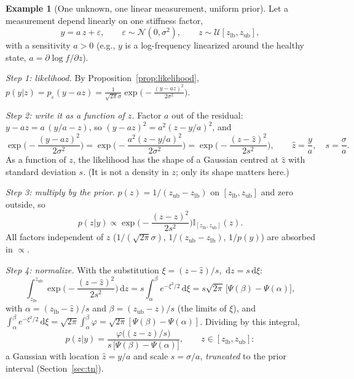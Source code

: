 \documentclass[11pt,a4paper]{article}
\numberwithin{equation}{section}
\theoremstyle{plain}
\theoremstyle{definition}
\newtheorem{example}[proposition]{Example}
\theoremstyle{remark}
\newcommand{\N}{\mathcal{N}}
\newcommand{\U}{\mathcal{U}}
\newcommand{\dd}{\,\mathrm{d}}
\newcommand{\zlb}{z_{\text{lb}}}
\newcommand{\zub}{z_{\text{ub}}}
\newcommand{\ind}{\mathbb{I}}
\begin{document}
\begin{example}[One unknown, one linear measurement, uniform prior]
\label{ex:1d}
Let a measurement depend linearly on one stiffness factor,
\begin{equation*}
y=a\,z+\varepsilon,\qquad\varepsilon\sim\N(0,\sigma^2),\qquad z\sim\U[\zlb,\zub],
\end{equation*}
with a sensitivity $a>0$ (e.g., $y$ is a log-frequency linearized around the healthy state, $a=\partial\log f/\partial z$).

\emph{Step 1: likelihood.} By Proposition~\ref{prop:likelihood}, $p(y|z)=p_\varepsilon(y-az)=\frac{1}{\sqrt{2\pi}\sigma}\exp\big(-\frac{(y-az)^2}{2\sigma^2}\big)$.

\emph{Step 2: write it as a function of $z$.} Factor $a$ out of the residual: $y-az=a\,(y/a-z)$, so $(y-az)^2=a^2(z-y/a)^2$, and
\begin{equation*}
\exp\Big(-\frac{(y-az)^2}{2\sigma^2}\Big)=\exp\Big(-\frac{a^2(z-y/a)^2}{2\sigma^2}\Big)=\exp\Big(-\frac{(z-\hat z)^2}{2s^2}\Big),\qquad \hat z=\frac ya,\quad s=\frac\sigma a.
\end{equation*}
As a function of $z$, the likelihood has the shape of a Gaussian centred at $\hat z$ with standard deviation $s$. (It is not a density in $z$; only its shape matters here.)

\emph{Step 3: multiply by the prior.} $p(z)=1/(\zub-\zlb)$ on $[\zlb,\zub]$ and zero outside, so
\begin{equation*}
p(z|y)\propto\exp\Big(-\frac{(z-\hat z)^2}{2s^2}\Big)\ind_{[\zlb,\zub]}(z).
\end{equation*}
All factors independent of $z$ ($1/(\sqrt{2\pi}\sigma)$, $1/(\zub-\zlb)$, $1/p(y)$) are absorbed in $\propto$.

\emph{Step 4: normalize.} With the substitution $\xi=(z-\hat z)/s$, $\dd z=s\dd\xi$:
\begin{equation*}
\int_{\zlb}^{\zub}\exp\Big(-\frac{(z-\hat z)^2}{2s^2}\Big)\dd z=s\int_{\alpha}^{\beta}e^{-\xi^2/2}\dd\xi=s\sqrt{2\pi}\,\big[\Psi(\beta)-\Psi(\alpha)\big],
\end{equation*}
with $\alpha=(\zlb-\hat z)/s$ and $\beta=(\zub-\hat z)/s$ (the limits of $\xi$), and $\int_\alpha^\beta e^{-\xi^2/2}\dd\xi=\sqrt{2\pi}\int_\alpha^\beta\varphi=\sqrt{2\pi}[\Psi(\beta)-\Psi(\alpha)]$.
Dividing by this integral,
\begin{equation*}
p(z|y)=\frac{\varphi\big((z-\hat z)/s\big)}{s\,\big[\Psi(\beta)-\Psi(\alpha)\big]},\qquad z\in[\zlb,\zub]:
\end{equation*}
a Gaussian with location $\hat z=y/a$ and scale $s=\sigma/a$, \emph{truncated} to the prior interval (Section~\ref{sec:tn}).


\end{example}
\end{document}
